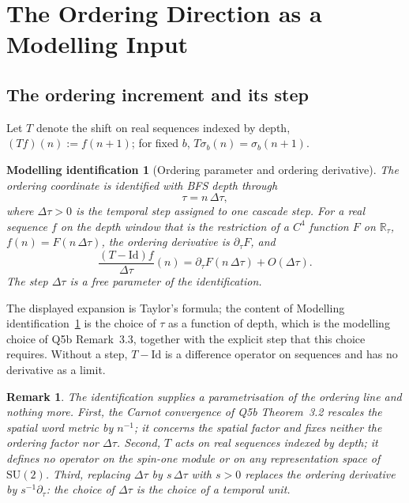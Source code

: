 \documentclass[12pt,a4paper]{article}
\newtheorem{remark}[theorem]{Remark}
\newtheorem{modelling}[theorem]{Modelling identification}
\newcommand{\SU}{\mathrm{SU}}
\newcommand{\Rtau}{\mathbb{R}_\tau}
\begin{document}
      \newpage
  \section{The Ordering Direction as a Modelling Input}
    \label{sec:internalization}

    \subsection{The ordering increment and its step}

      Let $T$ denote the shift on real sequences indexed by depth, $(Tf)(n) := f(n+1)$; for fixed $b$,
      $T\sigma_b(n) = \sigma_b(n+1)$.

      \begin{modelling}[Ordering parameter and ordering derivative]
        \label{lem:internalization}
        The ordering coordinate is identified with BFS depth through
        \[
          \tau = n\,\Delta\tau,
        \]
        where $\Delta\tau > 0$ is the temporal step assigned to one cascade step.
        For a real sequence $f$ on the depth window that is the restriction of a $C^4$ function $F$ on $\Rtau$,
        $f(n) = F(n\,\Delta\tau)$, the ordering derivative is $\partial_\tau F$, and
        \[
          \frac{(T - \mathrm{Id})f}{\Delta\tau}(n) = \partial_\tau F(n\,\Delta\tau) + O(\Delta\tau).
        \]
        The step $\Delta\tau$ is a free parameter of the identification.
      \end{modelling}

      The displayed expansion is Taylor's formula; the content of Modelling identification~\ref{lem:internalization}
      is the choice of $\tau$ as a function of depth, which is the modelling choice of Q5b Remark~3.3, together with
      the explicit step that this choice requires.
      Without a step, $T - \mathrm{Id}$ is a difference operator on sequences and has no derivative as a limit.

      \begin{remark}
        The identification supplies a parametrisation of the ordering line and nothing more.
        First, the Carnot convergence of Q5b Theorem~3.2 rescales the spatial word metric by $n^{-1}$; it concerns the
        spatial factor and fixes neither the ordering factor nor $\Delta\tau$.
        Second, $T$ acts on real sequences indexed by depth; it defines no operator on the spin-one module or on any
        representation space of $\SU(2)$.
        Third, replacing $\Delta\tau$ by $s\,\Delta\tau$ with $s>0$ replaces the ordering derivative by
        $s^{-1}\partial_\tau$: the choice of $\Delta\tau$ is the choice of a temporal unit.
      \end{remark}
\end{document}
